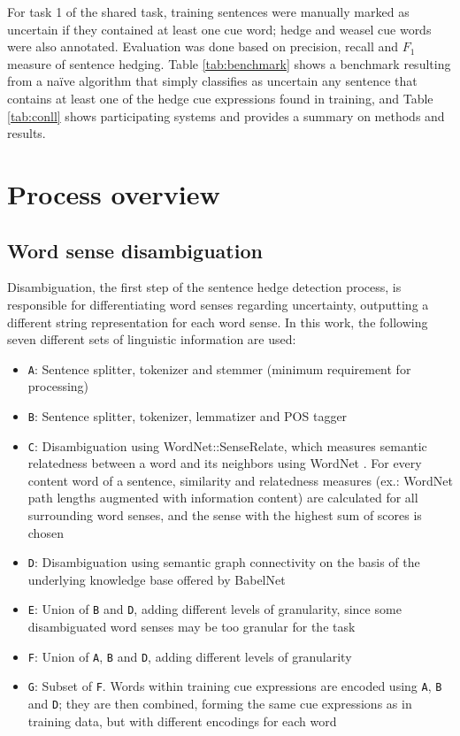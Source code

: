 \documentclass[english]{jnlp_1.4}
\begin{document}
For task 1 of the shared task, training sentences were manually marked as uncertain if they contained at least one cue word; hedge and weasel cue words were also annotated. Evaluation was done based on precision, recall and $F_1$ measure of sentence hedging. Table \ref{tab:benchmark} shows a benchmark resulting from a na\"{i}ve algorithm that simply classifies as uncertain any sentence that contains at least one of the hedge cue expressions found in training, and Table \ref{tab:conll} shows participating systems and provides a summary on methods and results.



\section{Process overview}
\label{sec:overview}

\subsection{Word sense disambiguation}

Disambiguation, the first step of the sentence hedge detection process, is responsible for differentiating word senses regarding uncertainty, outputting a different string representation for each word sense. In this work, the following seven different sets of linguistic information are used:

\begin{itemize}
	\item \texttt{A}: Sentence splitter, tokenizer and stemmer (minimum requirement for processing)
	\item \texttt{B}: Sentence splitter, tokenizer, lemmatizer and POS tagger
	\item \texttt{C}: Disambiguation using WordNet::SenseRelate, which measures semantic relatedness between a word and its neighbors using WordNet . For every content word of a sentence, similarity and relatedness measures (ex.: WordNet path lengths augmented with information content) are calculated for all surrounding word senses, and the sense with the highest sum of scores is chosen
	\item \texttt{D}: Disambiguation using semantic graph connectivity on the basis of the underlying knowledge base offered by BabelNet 
	\item \texttt{E}: Union of \texttt{B} and \texttt{D}, adding different levels of granularity, since some disambiguated word senses may be too granular for the task
	\item \texttt{F}: Union of \texttt{A}, \texttt{B} and \texttt{D}, adding different levels of granularity
	\item \texttt{G}: Subset of \texttt{F}. Words within training cue expressions are encoded using \texttt{A}, \texttt{B} and \texttt{D}; they are then combined, forming the same cue expressions as in training data, but with different encodings for each word
\end{itemize}
\end{document}

